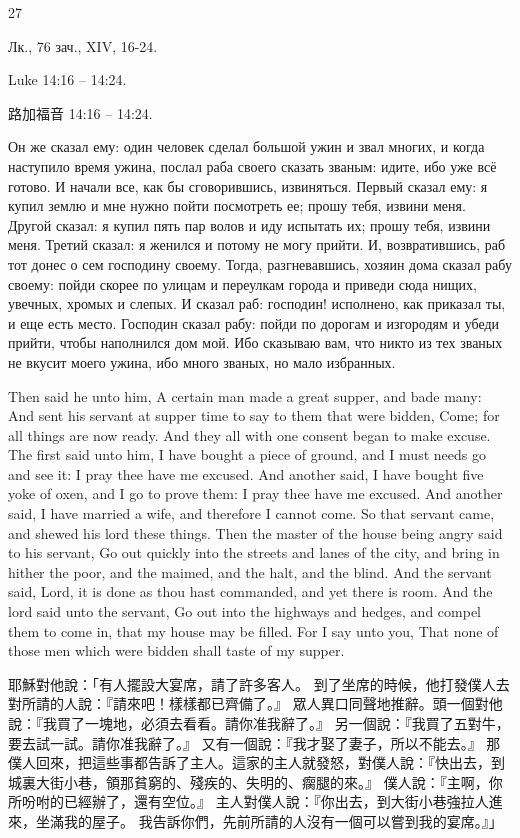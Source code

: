 27

\singlespacing %

\singlespacing %

\Large

Лк., 76 зач., XIV, 16-24.

Luke 14:16 -- 14:24.

路加福音 14:16 -- 14:24.

Он же сказал ему: один человек сделал большой ужин и звал многих,
и когда наступило время ужина, послал раба своего сказать званым: идите, ибо уже всё готово.
И начали все, как бы сговорившись, извиняться. Первый сказал ему: я купил землю и мне нужно пойти посмотреть ее; прошу тебя, извини меня.
Другой сказал: я купил пять пар волов и иду испытать их; прошу тебя, извини меня.
Третий сказал: я женился и потому не могу прийти.
И, возвратившись, раб тот донес о сем господину своему. Тогда, разгневавшись, хозяин дома сказал рабу своему: пойди скорее по улицам и переулкам города и приведи сюда нищих, увечных, хромых и слепых.
И сказал раб: господин! исполнено, как приказал ты, и еще есть место.
Господин сказал рабу: пойди по дорогам и изгородям и убеди прийти, чтобы наполнился дом мой.
Ибо сказываю вам, что никто из тех званых не вкусит моего ужина, ибо много званых, но мало избранных.

Then said he unto him, A certain man made a great supper, and bade many:
And sent his servant at supper time to say to them that were bidden, Come; for all things are now ready.
And they all with one consent began to make excuse. The first said unto him, I have bought a piece of ground, and I must needs go and see it: I pray thee have me excused.
And another said, I have bought five yoke of oxen, and I go to prove them: I pray thee have me excused.
And another said, I have married a wife, and therefore I cannot come.
So that servant came, and shewed his lord these things. Then the master of the house being angry said to his servant, Go out quickly into the streets and lanes of the city, and bring in hither the poor, and the maimed, and the halt, and the blind.
And the servant said, Lord, it is done as thou hast commanded, and yet there is room.
And the lord said unto the servant, Go out into the highways and hedges, and compel them to come in, that my house may be filled.
For I say unto you, That none of those men which were bidden shall taste of my supper.

耶穌對他說：「有人擺設大宴席，請了許多客人。
到了坐席的時候，他打發僕人去對所請的人說：『請來吧！樣樣都已齊備了。』
眾人異口同聲地推辭。頭一個對他說：『我買了一塊地，必須去看看。請你准我辭了。』
另一個說：『我買了五對牛，要去試一試。請你准我辭了。』
又有一個說：『我才娶了妻子，所以不能去。』
那僕人回來，把這些事都告訴了主人。這家的主人就發怒，對僕人說：『快出去，到城裏大街小巷，領那貧窮的、殘疾的、失明的、瘸腿的來。』
僕人說：『主啊，你所吩咐的已經辦了，還有空位。』
主人對僕人說：『你出去，到大街小巷強拉人進來，坐滿我的屋子。
我告訴你們，先前所請的人沒有一個可以嘗到我的宴席。』」 
